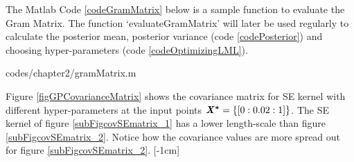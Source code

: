 The Matlab Code \ref{codeGramMatrix} below is a sample function to evaluate the Gram Matrix. The function  `evaluateGramMatrix' will later be used regularly to calculate the posterior mean, posterior variance (code \ref{codePosterior}) and choosing hyper-parameters (code \ref{codeOptimizingLML}). 


\begin{mdframed}[hidealllines=true,backgroundcolor=lightgray!20]

                    {codes/chapter2/gramMatrix.m}
\end{mdframed}

Figure \ref{figGPCovarianceMatrix} shows the covariance matrix for SE kernel with different hyper-parameters at the input points $\bm{\mathit{X^{*}}} = \{[0:0.02:1]\}$. The SE kernel of figure \ref{subFigcovSEmatrix_1} has a lower length-scale than figure \ref{subFigcovSEmatrix_2}. Notice how the covariance values are more spread out for figure \ref{subFigcovSEmatrix_2}.
[-1cm]


